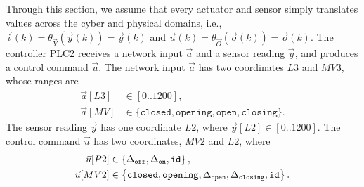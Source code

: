 {Through this section, we assume that every actuator and sensor simply translates values across the cyber and physical domains, i.e., $\vec{i}(k)=\theta_{\vec{Y}}(\vec{y}(k))=\vec{y}(k)$ and $\vec{u}(k)=\theta_{\vec{O}}(\vec{o}(k))=\vec{o}(k)$. The controller PLC2 receives a network input $\vec{a}$ and a sensor reading $\vec{y}$, and produces a control command $\vec{u}$. The network input $\vec{a}$ has two coordinates $L3$ and $MV3$, whose ranges are 
\begin{align*}
  \vec{a}[L3]&\in[0..1200],\\ 
  \vec{a}[MV]&\in \{\texttt{closed},\texttt{opening},\texttt{open},\texttt{closing}\}.
\end{align*} 
The sensor reading $\vec{y}$ has one coordinate $L2$, where $\vec{y}[L2]\in[0..1200]$. 
The control command $\vec{u}$ has two coordinates, $MV2$ and $L2$, where 
\begin{align*}
  \vec{u}[P2]&\in\left\{{\Delta}_\texttt{off},{\Delta}_\texttt{on},{\texttt{id}}\right\},\\
  \vec{u}[MV2]&\in\left\{\texttt{closed},\texttt{opening},{\Delta}_\texttt{open},{\Delta}_\texttt{closing}, {\texttt{id}}\right\}.
\end{align*}

}
